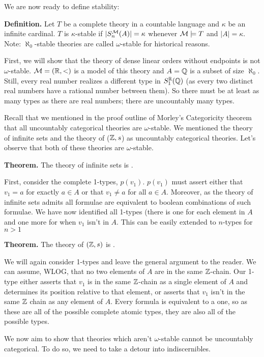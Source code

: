 We are now ready to define stability: 

\textbf{Definition.} Let \(T\) be a complete theory in a countable language and \(\kappa\) be an infinite cardinal. \(T\) is \(\kappa\)-stable if \(|S_n^{\mathcal{M}}(A)| = \kappa\) whenever \(\mathcal{M} \models T\) and \(|A| = \kappa\). Note: \(\aleph_0\)-stable theories are called \(\omega\)-stable for historical reasons. 

First, we will show that the theory of dense linear orders without endpoints is not \(\omega\)-stable. \(\mathcal{M} = (\mathbb{R}, <)\) is a model of this theory and \(A = \mathbb{Q}\) is a subset of size \(\aleph_0\). Still, every real number realizes a different type in \(S_1^{\mathbb{R}}(\mathbb{Q})\) (as every two distinct real numbers have a rational number between them). So there must be at least as many types as there are real numbers; there are uncountably many types.  

Recall that we mentioned in the proof outline of Morley's Categoricity theorem that all uncountably categorical theories are \(\omega\)-stable. We mentioned the theory of infinite sets and the theory of (\(\mathbb{Z}, s\)) as uncountably categorical theories. Let's observe that both of these theories are \(\omega\)-stable. 


\textbf{Theorem.} The theory of infinite sets is \omst. 

First, consider the complete 1-types, \(p(v_1)\). \(p(v_1)\) must assert either that \(v_1 = a\) for exactly \(a \in A\) or that \(v_1 \neq a\) for all \(a \in A\). Moreover, as the theory of infinite sets admits \qe all formulae are equivalent to boolean combinations of such formulae. We have now identified all 1-types (there is one for each element in \(A\) and one more for when \(v_1\) isn't in \(A\). This can be easily extended to \(n\)-types for \(n > 1\)

\textbf{Theorem.} The theory of \((\mathbb{Z}, s)\) is \omst. 

We will again consider 1-types and leave the general argument to the reader. We can assume, WLOG, that no two elements of \(A\) are in the same \(\mathbb{Z}\)-chain. Our 1-type either asserts that \(v_1\) is in the same \(\mathbb{Z}\)-chain as a single element of \(A\) and determines its position relative to that element, or asserts that \(v_1\) isn't in the same \(\mathbb{Z}\) chain as any element of \(A\). Every formula is equivalent to a \qf one, so as these are all of the possible complete atomic types, they are also all of the possible types.    

We now aim to show that theories which aren't \(\omega\)-stable cannot be uncountably categorical. To do so, we need to take a detour into indiscernibles.
